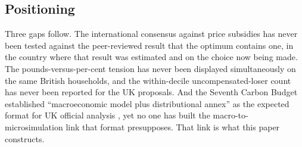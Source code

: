 \subsection{Positioning}

Three gaps follow. The international consensus against price subsidies has never been tested against the peer-reviewed result that the optimum contains one, in the country where that result was estimated and on the choice now being made. The pounds-versus-per-cent tension has never been displayed simultaneously on the same British households, and the within-decile uncompensated-loser count has never been reported for the UK proposals. And the Seventh Carbon Budget established ``macroeconomic model plus distributional annex'' as the expected format for UK official analysis \citep{youngman2026}, yet no one has built the macro-to-microsimulation link that format presupposes. That link is what this paper constructs.
